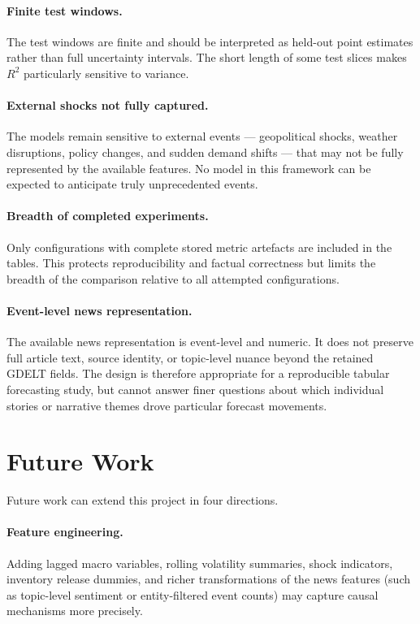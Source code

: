 \documentclass[12pt,a4paper]{article}
\begin{document}
\paragraph{Finite test windows.} The test windows are finite and should be interpreted as held-out point estimates rather than full uncertainty intervals. The short length of some test slices makes $R^2$ particularly sensitive to variance.

\paragraph{External shocks not fully captured.} The models remain sensitive to external events — geopolitical shocks, weather disruptions, policy changes, and sudden demand shifts — that may not be fully represented by the available features. No model in this framework can be expected to anticipate truly unprecedented events.

\paragraph{Breadth of completed experiments.} Only configurations with complete stored metric artefacts are included in the tables. This protects reproducibility and factual correctness but limits the breadth of the comparison relative to all attempted configurations.

\paragraph{Event-level news representation.} The available news representation is event-level and numeric. It does not preserve full article text, source identity, or topic-level nuance beyond the retained GDELT fields. The design is therefore appropriate for a reproducible tabular forecasting study, but cannot answer finer questions about which individual stories or narrative themes drove particular forecast movements.

\section{Future Work}\label{sec:future-work}

Future work can extend this project in four directions.

\paragraph{Feature engineering.} Adding lagged macro variables, rolling volatility summaries, shock indicators, inventory release dummies, and richer transformations of the news features (such as topic-level sentiment or entity-filtered event counts) may capture causal mechanisms more precisely.
\end{document}
